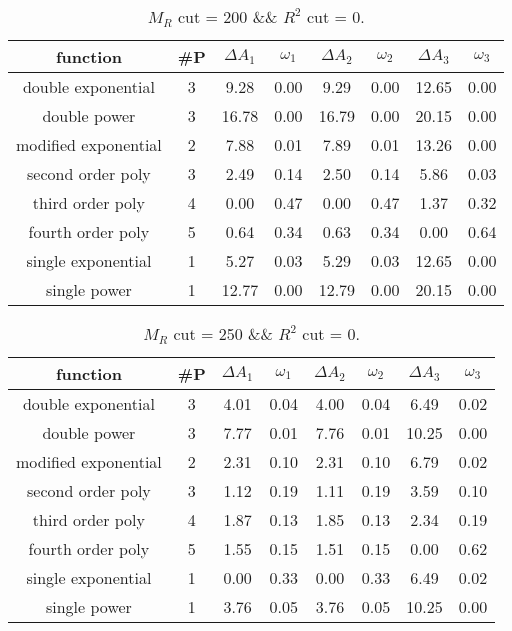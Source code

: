  
\begin{table}[H] 
\begin{center} 
\begin{tabular}{|c|c|cc|cc|cc|} 
\hline function & \#P & $\Delta A_1$ & $\omega_1$ & $\Delta A_2$ & $\omega_2$ & $\Delta A_3$ & $\omega_3$ \\ \hline 
double exponential &  3 &   9.28 &   0.00 &   9.29 &   0.00 &  12.65 &   0.00 \\ 
double power &  3 &  16.78 &   0.00 &  16.79 &   0.00 &  20.15 &   0.00 \\ 
modified exponential &  2 &   7.88 &   0.01 &   7.89 &   0.01 &  13.26 &   0.00 \\ 
second order poly &  3 &   2.49 &   0.14 &   2.50 &   0.14 &   5.86 &   0.03 \\ 
third order poly &  4 &   0.00 &   0.47 &   0.00 &   0.47 &   1.37 &   0.32 \\ 
fourth order poly &  5 &   0.64 &   0.34 &   0.63 &   0.34 &   0.00 &   0.64 \\ 
single exponential &  1 &   5.27 &   0.03 &   5.29 &   0.03 &  12.65 &   0.00 \\ 
single power &  1 &  12.77 &   0.00 &  12.79 &   0.00 &  20.15 &   0.00 \\ 
\hline 
\end{tabular} 
\caption{$M_R$ cut = 200 \&\& $R^2$ cut = 0.} 
\label{tab:FitChoices_200_0} 
\end{center} 
\end{table} 
 
 
\begin{table}[H] 
\begin{center} 
\begin{tabular}{|c|c|cc|cc|cc|} 
\hline function & \#P & $\Delta A_1$ & $\omega_1$ & $\Delta A_2$ & $\omega_2$ & $\Delta A_3$ & $\omega_3$ \\ \hline 
double exponential &  3 &   4.01 &   0.04 &   4.00 &   0.04 &   6.49 &   0.02 \\ 
double power &  3 &   7.77 &   0.01 &   7.76 &   0.01 &  10.25 &   0.00 \\ 
modified exponential &  2 &   2.31 &   0.10 &   2.31 &   0.10 &   6.79 &   0.02 \\ 
second order poly &  3 &   1.12 &   0.19 &   1.11 &   0.19 &   3.59 &   0.10 \\ 
third order poly &  4 &   1.87 &   0.13 &   1.85 &   0.13 &   2.34 &   0.19 \\ 
fourth order poly &  5 &   1.55 &   0.15 &   1.51 &   0.15 &   0.00 &   0.62 \\ 
single exponential &  1 &   0.00 &   0.33 &   0.00 &   0.33 &   6.49 &   0.02 \\ 
single power &  1 &   3.76 &   0.05 &   3.76 &   0.05 &  10.25 &   0.00 \\ 
\hline 
\end{tabular} 
\caption{$M_R$ cut = 250 \&\& $R^2$ cut = 0.} 
\label{tab:FitChoices_250_0} 
\end{center} 
\end{table} 
 
